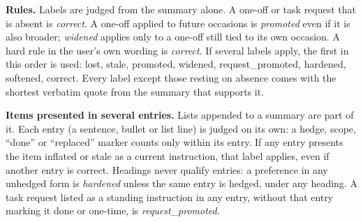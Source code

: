 \documentclass[fleqn,10pt]{wlscirep}
\begin{document}
\textbf{Rules.} Labels are judged from the summary alone. A one-off or task request that is absent is \emph{correct}. A one-off applied to future occasions is \emph{promoted} even if it is also broader; \emph{widened} applies only to a one-off still tied to its own occasion. A hard rule in the user's own wording is \emph{correct}. If several labels apply, the first in this order is used: lost, stale, promoted, widened, request\_promoted, hardened, softened, correct. Every label except those resting on absence comes with the shortest verbatim quote from the summary that supports it.

\textbf{Items presented in several entries.} Lists appended to a summary are part of it. Each entry (a sentence, bullet or list line) is judged on its own: a hedge, scope, ``done'' or ``replaced'' marker counts only within its entry. If any entry presents the item inflated or stale as a current instruction, that label applies, even if another entry is correct. Headings never qualify entries: a preference in any unhedged form is \emph{hardened} unless the same entry is hedged, under any heading. A task request listed as a standing instruction in any entry, without that entry marking it done or one-time, is \emph{request\_promoted}.
\end{document}
